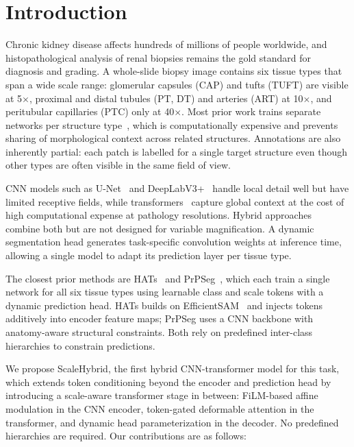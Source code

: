 \documentclass[runningheads]{llncs}
\begin{document}
\section{Introduction}

Chronic kidney disease affects hundreds of millions of people worldwide, and histopathological analysis of renal biopsies remains the gold standard for diagnosis and grading. A whole-slide biopsy image contains six tissue types that span a wide scale range: glomerular capsules (CAP) and tufts (TUFT) are visible at 5$\times$, proximal and distal tubules (PT, DT) and arteries (ART) at 10$\times$, and peritubular capillaries (PTC) only at 40$\times$. Most prior work trains separate networks per structure type~\cite{ronneberger2015unet,chen2018deeplabv3plus,jha2024transnetr}, which is computationally expensive and prevents sharing of morphological context across related structures. Annotations are also inherently partial: each patch is labelled for a single target structure even though other types are often visible in the same field of view.

CNN models such as U-Net~\cite{ronneberger2015unet} and DeepLabV3+~\cite{chen2018deeplabv3plus} handle local detail well but have limited receptive fields, while transformers~\cite{chen2021transunet,xie2021segformer} capture global context at the cost of high computational expense at pathology resolutions. Hybrid approaches~\cite{jha2024transnetr} combine both but are not designed for variable magnification. A dynamic segmentation head generates task-specific convolution weights at inference time, allowing a single model to adapt its prediction layer per tissue type.

The closest prior methods are HATs~\cite{hats2024} and PrPSeg~\cite{prpseg2024}, which each train a single network for all six tissue types using learnable class and scale tokens with a dynamic prediction head. HATs builds on EfficientSAM~\cite{xiong2024efficientsam} and injects tokens additively into encoder feature maps; PrPSeg uses a CNN backbone with anatomy-aware structural constraints. Both rely on predefined inter-class hierarchies to constrain predictions.

We propose ScaleHybrid, the first hybrid CNN-transformer model for this task, which extends token conditioning beyond the encoder and prediction head by introducing a scale-aware transformer stage in between: FiLM-based affine modulation in the CNN encoder, token-gated deformable attention in the transformer, and dynamic head parameterization in the decoder. No predefined hierarchies are required. Our contributions are as follows:
\end{document}
